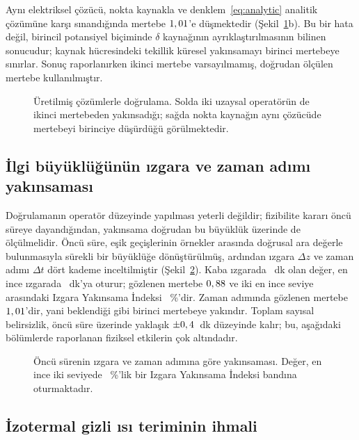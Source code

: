 \documentclass[11pt,a4paper]{article}
\begin{document}
Aynı elektriksel çözücü, nokta kaynakla ve denklem~\eqref{eq:analytic}
analitik çözümüne karşı sınandığında mertebe $1,01$'e düşmektedir
(Şekil~\ref{fig:conv}b). Bu bir hata değil, birincil potansiyel biçiminde
$\delta$ kaynağının ayrıklaştırılmasının bilinen sonucudur; kaynak hücresindeki
tekillik küresel yakınsamayı birinci mertebeye sınırlar. Sonuç raporlanırken
ikinci mertebe varsayılmamış, doğrudan ölçülen mertebe kullanılmıştır.

\begin{figure}[htbp]\centering

\caption{Üretilmiş çözümlerle doğrulama. Solda iki uzaysal operatörün de
ikinci mertebeden yakınsadığı; sağda nokta kaynağın aynı çözücüde mertebeyi
birinciye düşürdüğü görülmektedir.}
\label{fig:conv}
\end{figure}

\subsection{İlgi büyüklüğünün ızgara ve zaman adımı yakınsaması}

Doğrulamanın operatör düzeyinde yapılması yeterli değildir; fizibilite kararı
öncü süreye dayandığından, yakınsama doğrudan bu büyüklük üzerinde de
ölçülmelidir. Öncü süre, eşik geçişlerinin örnekler arasında doğrusal ara
değerle bulunmasıyla sürekli bir büyüklüğe dönüştürülmüş, ardından ızgara
$\Delta z$ ve zaman adımı $\Delta t$ dört kademe inceltilmiştir
(Şekil~\ref{fig:gridconv}). Kaba ızgarada \leadCoarse~dk olan değer, en ince
ızgarada \leadFine~dk'ya oturur; gözlenen mertebe $0,88$ ve iki en ince
seviye arasındaki Izgara Yakınsama İndeksi \gciGrid~\%'dir. Zaman adımında
gözlenen mertebe $1,01$'dir, yani beklendiği gibi birinci mertebeye yakındır.
Toplam sayısal belirsizlik, öncü süre üzerinde yaklaşık $\pm0,4$~dk
düzeyinde kalır; bu, aşağıdaki bölümlerde raporlanan fiziksel etkilerin çok
altındadır.

\begin{figure}[htbp]\centering

\caption{Öncü sürenin ızgara ve zaman adımına göre yakınsaması. Değer, en ince
iki seviyede \gciGrid~\%'lik bir Izgara Yakınsama İndeksi bandına oturmaktadır.}
\label{fig:gridconv}
\end{figure}

\subsection{İzotermal gizli ısı teriminin ihmali}
\label{sec:latent}
\end{document}

